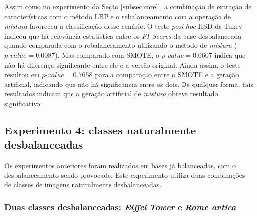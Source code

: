 
Assim como no experimento da Seção \ref{subsec:corel}, a combinação de extração de características com o método LBP e o rebalanceamento com a operação de \emph{mistura} favoreceu a classificação desse cenário. O teste \textit{post-hoc} HSD de Tukey indicou que há relevância estatística entre os \textit{F1-Scores} da base desbalanceada quando comparada com o rebalanceamento utilizando o método de \emph{mistura} ($ \textit{p-value} = 0.0087$). Mas comparado com SMOTE, o $\textit{p-value} = 0.0607$ indica que não há diferença significante entre ele e a versão original. Ainda assim, o teste resultou em $\textit{p-value} = 0.7658$ para a comparação entre o SMOTE e a geração artificial, indicando que não há significância entre os dois. De qualquer forma, tais resultados indicam que a geração artificial de \emph{mistura} obteve resultado significativo.

\subsection{Experimento 4: classes naturalmente desbalanceadas}

Os experimentos anteriores foram realizados em bases já balanceadas, com o desbalanceamento sendo provocado. Este experimento utiliza duas combinações de classes de imagens naturalmente desbalanceadas.


\subsubsection{Duas classes desbalanceadas: \textit{Eiffel Tower} e \textit{Rome antica}}



